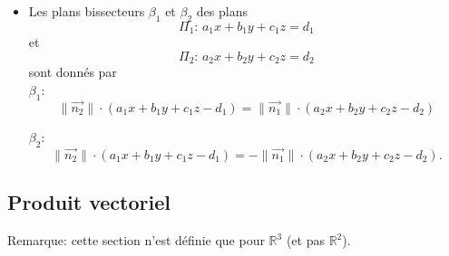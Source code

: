 \documentclass[12pt,a4paper]{article}
\newcommand{\vect}{\overrightarrow}
\begin{document}
\begin{itemize}[label=$\bullet$]
\begin{itemize}[label=$\circ$]
\item Les \colorbox{def!40}{plans bissecteurs} $\beta_1$ et $\beta_2$ des plans $$\Pi_1:\,a_1x+b_1y+c_1z=d_1$$ et $$\Pi_2:\,a_2x+b_2y+c_2z=d_2$$ sont donnés par
\\
$\beta_{1}$:
    $$\|\vect{n_2}\|\cdot(a_1x+b_1y+c_1z-d_1)= \|\vect{n_1}\|\cdot(a_2x+b_2y+c_2z-d_2)$$ 

$\beta_{2}$:
    $$\|\vect{n_2}\|\cdot(a_1x+b_1y+c_1z-d_1)= -\|\vect{n_1}\|\cdot(a_2x+b_2y+c_2z-d_2).$$ 
    
\end{itemize}
\end{itemize}

\newpage
\subsection{Produit vectoriel}
\textcolor{expl!60!black}{Remarque:} cette section n'est définie que pour $\mathbb{R}^3$ (et pas $\mathbb{R}^2$).
\end{document}
